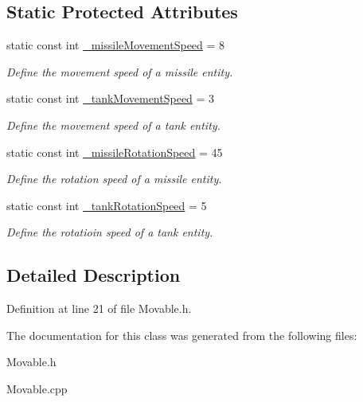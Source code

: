 \subsection*{Static Protected Attributes}
\begin{DoxyCompactItemize}
\item 
\hypertarget{class_movable_aff7e2a3e3d5a6059c4fe138aa47dc048}{static const int \hyperlink{class_movable_aff7e2a3e3d5a6059c4fe138aa47dc048}{\+\_\+missile\+Movement\+Speed} = 8}\label{class_movable_aff7e2a3e3d5a6059c4fe138aa47dc048}

\begin{DoxyCompactList}\small\item\em Define the movement speed of a missile entity. \end{DoxyCompactList}\item 
\hypertarget{class_movable_a54cb7d3465cc78ad7d8b2f7c2d842732}{static const int \hyperlink{class_movable_a54cb7d3465cc78ad7d8b2f7c2d842732}{\+\_\+tank\+Movement\+Speed} = 3}\label{class_movable_a54cb7d3465cc78ad7d8b2f7c2d842732}

\begin{DoxyCompactList}\small\item\em Define the movement speed of a tank entity. \end{DoxyCompactList}\item 
\hypertarget{class_movable_afde3611f73293d67497a39fed061e3a8}{static const int \hyperlink{class_movable_afde3611f73293d67497a39fed061e3a8}{\+\_\+missile\+Rotation\+Speed} = 45}\label{class_movable_afde3611f73293d67497a39fed061e3a8}

\begin{DoxyCompactList}\small\item\em Define the rotation speed of a missile entity. \end{DoxyCompactList}\item 
\hypertarget{class_movable_ab4ad35a0057bdbc80385c67bec5f1a60}{static const int \hyperlink{class_movable_ab4ad35a0057bdbc80385c67bec5f1a60}{\+\_\+tank\+Rotation\+Speed} = 5}\label{class_movable_ab4ad35a0057bdbc80385c67bec5f1a60}

\begin{DoxyCompactList}\small\item\em Define the rotatioin speed of a tank entity. \end{DoxyCompactList}\end{DoxyCompactItemize}


\subsection{Detailed Description}


Definition at line 21 of file Movable.\+h.



The documentation for this class was generated from the following files\+:\begin{DoxyCompactItemize}
\item 
Movable.\+h\item 
Movable.\+cpp\end{DoxyCompactItemize}
